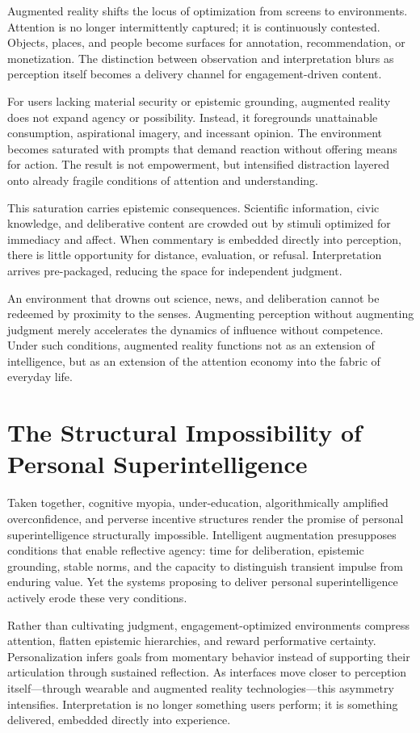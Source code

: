 \documentclass[12pt]{article}
\begin{document}
Augmented reality shifts the locus of optimization from screens to environments. Attention is no longer intermittently captured; it is continuously contested. Objects, places, and people become surfaces for annotation, recommendation, or monetization. The distinction between observation and interpretation blurs as perception itself becomes a delivery channel for engagement-driven content.

For users lacking material security or epistemic grounding, augmented reality does not expand agency or possibility. Instead, it foregrounds unattainable consumption, aspirational imagery, and incessant opinion. The environment becomes saturated with prompts that demand reaction without offering means for action. The result is not empowerment, but intensified distraction layered onto already fragile conditions of attention and understanding.

This saturation carries epistemic consequences. Scientific information, civic knowledge, and deliberative content are crowded out by stimuli optimized for immediacy and affect. When commentary is embedded directly into perception, there is little opportunity for distance, evaluation, or refusal. Interpretation arrives pre-packaged, reducing the space for independent judgment.

An environment that drowns out science, news, and deliberation cannot be redeemed by proximity to the senses. Augmenting perception without augmenting judgment merely accelerates the dynamics of influence without competence. Under such conditions, augmented reality functions not as an extension of intelligence, but as an extension of the attention economy into the fabric of everyday life.

\section{The Structural Impossibility of Personal Superintelligence}

Taken together, cognitive myopia, under-education, algorithmically amplified overconfidence, and perverse incentive structures render the promise of personal superintelligence structurally impossible. Intelligent augmentation presupposes conditions that enable reflective agency: time for deliberation, epistemic grounding, stable norms, and the capacity to distinguish transient impulse from enduring value. Yet the systems proposing to deliver personal superintelligence actively erode these very conditions.

Rather than cultivating judgment, engagement-optimized environments compress attention, flatten epistemic hierarchies, and reward performative certainty. Personalization infers goals from momentary behavior instead of supporting their articulation through sustained reflection. As interfaces move closer to perception itself—through wearable and augmented reality technologies—this asymmetry intensifies. Interpretation is no longer something users perform; it is something delivered, embedded directly into experience.
\end{document}

